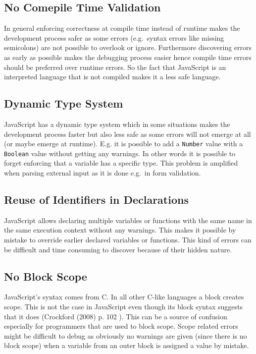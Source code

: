 	\subsection{No Comepile Time Validation} %
	\label{sub:no_compile_time_validation}
		In general enforcing correctness at compile time instead of runtime makes the development process safer as some errors (e.g.\ syntax errors like missing semicolons) are not possible to overlook or ignore. Furthermore discovering errors as early as possible makes the debugging process easier hence compile time errors should be preferred over runtime errors. So the fact that JavaScript is an interpreted language that is not compiled makes it a less safe language.

	\subsection{Dynamic Type System} %
	\label{sub:dynamic_type_system}
		JavaScript has a dynamic type system which in some situations makes the development process faster but also less safe as some errors will not emerge at all (or maybe emerge at runtime). E.g. it is possible to add a \texttt{Number} value with a \texttt{Boolean} value without getting any warnings. In other words it is possible to forget enforcing that a variable has a specific type. This problem is amplified when parsing external input as it is done e.g.\ in form validation.

	\subsection{Reuse of Identifiers in Declarations} %
	\label{sec:reuse_of_identifiers_in_declarations}
		JavaScript allows declaring multiple variables or functions with the same name in the same execution context without any warnings. This makes it possible by mistake to override earlier declared variables or functions. This kind of errors can be difficult and time consuming to discover because of their hidden nature.

	\subsection{No Block Scope} %
	\label{sub:no_block_scope}
		JavaScript's syntax comes from C. In all other C-like languages a block creates scope. This is not the case in JavaScript even though its block syntax suggests that it does (Crockford (2008) p. 102 \cite{good_parts}). This can be a source of confusion especially for programmers that are used to block scope. Scope related errors might be difficult to debug as obviously no warnings are given (since there is no block scope) when a variable from an outer block is assigned a value by mistake.

